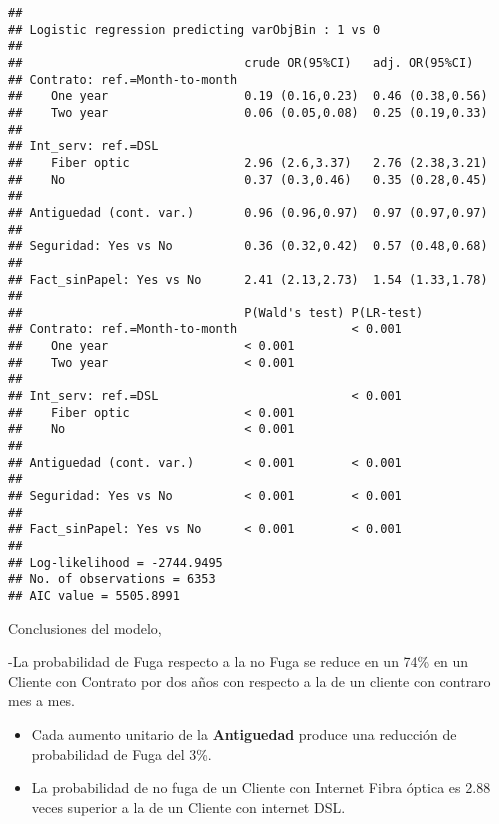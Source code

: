 \documentclass[
]{article}
\begin{document}
\begin{verbatim}
## 
## Logistic regression predicting varObjBin : 1 vs 0 
##  
##                               crude OR(95%CI)   adj. OR(95%CI)   
## Contrato: ref.=Month-to-month                                    
##    One year                   0.19 (0.16,0.23)  0.46 (0.38,0.56) 
##    Two year                   0.06 (0.05,0.08)  0.25 (0.19,0.33) 
##                                                                  
## Int_serv: ref.=DSL                                               
##    Fiber optic                2.96 (2.6,3.37)   2.76 (2.38,3.21) 
##    No                         0.37 (0.3,0.46)   0.35 (0.28,0.45) 
##                                                                  
## Antiguedad (cont. var.)       0.96 (0.96,0.97)  0.97 (0.97,0.97) 
##                                                                  
## Seguridad: Yes vs No          0.36 (0.32,0.42)  0.57 (0.48,0.68) 
##                                                                  
## Fact_sinPapel: Yes vs No      2.41 (2.13,2.73)  1.54 (1.33,1.78) 
##                                                                  
##                               P(Wald's test) P(LR-test)
## Contrato: ref.=Month-to-month                < 0.001   
##    One year                   < 0.001                  
##    Two year                   < 0.001                  
##                                                        
## Int_serv: ref.=DSL                           < 0.001   
##    Fiber optic                < 0.001                  
##    No                         < 0.001                  
##                                                        
## Antiguedad (cont. var.)       < 0.001        < 0.001   
##                                                        
## Seguridad: Yes vs No          < 0.001        < 0.001   
##                                                        
## Fact_sinPapel: Yes vs No      < 0.001        < 0.001   
##                                                        
## Log-likelihood = -2744.9495
## No. of observations = 6353
## AIC value = 5505.8991
\end{verbatim}

Conclusiones del modelo,

-La probabilidad de Fuga respecto a la no Fuga se reduce en un 74\% en
un Cliente con Contrato por dos años con respecto a la de un cliente con
contraro mes a mes.

\begin{itemize}
\item
  Cada aumento unitario de la \textbf{Antiguedad} produce una reducción
  de probabilidad de Fuga del 3\%.
\item
  La probabilidad de no fuga de un Cliente con Internet Fibra óptica es
  2.88 veces superior a la de un Cliente con internet DSL.
\end{itemize}
\end{document}

